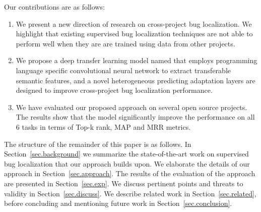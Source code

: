 Our contributions are as follows:

\begin{enumerate}

\item We present a new direction of research on cross-project bug localization. We highlight that existing supervised bug localization techniques are not able to perform well when they are are trained using data from other projects. 
    
\item {} We propose a deep transfer learning model named \TRANPCNN that employs programming language specific convolutional neural network to extract transferable semantic features, and a novel heterogeneous predicting adaptation layers are designed to improve cross-project bug localization performance.  

\item {} We have evaluated our proposed approach on several open source projects. The results show that the \TRANPCNN model significantly improve the performance on all 6 tasks in terms of Top-k rank, MAP and MRR metrics. 


\end{enumerate}

The structure of the remainder of this paper is as follows. In Section~\ref{sec.background} we summarize the state-of-the-art work on supervised bug localization that our approach builds upon. We elaborate the details of our approach in Section~\ref{sec.approach}. The results of the evaluation of the approach are presented in Section~\ref{sec.exp}. We discuss pertinent points and threats to validity in Section~\ref{sec.discuss}. We describe related work in Section~\ref{sec.related}, before concluding and mentioning future work in Section~\ref{sec.conclusion}. 